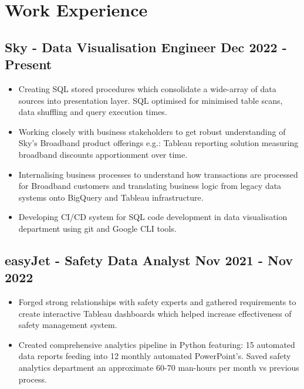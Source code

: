 \documentclass[a4paper,9pt]{article}
\begin{document}
\section*{Work Experience}
\subsection*{\textbf{Sky - Data Visualisation Engineer} \hfill  Dec 2022 - Present}
\begin{itemize}[noitemsep]
    \item Creating SQL stored procedures which consolidate a wide-array of data sources into presentation layer. SQL optimised for minimised table scans, data shuffling and query execution times.
    \item Working closely with business stakeholders to get robust understanding of Sky's Broadband product offerings e.g.: Tableau reporting solution measuring broadband discounts apportionment over time.
    \item Internalising business processes to understand how transactions are processed for Broadband customers and translating business logic from legacy data systems onto BigQuery and Tableau infrastructure.
    \item Developing CI/CD system for SQL code development in data visualisation department using git and Google CLI tools. 
\end{itemize}

\subsection*{\textbf{easyJet - Safety Data Analyst} \hfill  Nov 2021 - Nov 2022}
\begin{itemize}[noitemsep]
    \item Forged strong relationships with safety experts and gathered requirements to create interactive Tableau dashboards which helped increase effectiveness of safety management system.
    \item Created comprehensive analytics pipeline in Python featuring: 15 automated data reports feeding into 12 monthly automated PowerPoint's. Saved safety analytics department an approximate 60-70 man-hours per month vs previous process.
\end{itemize}
\end{document}
